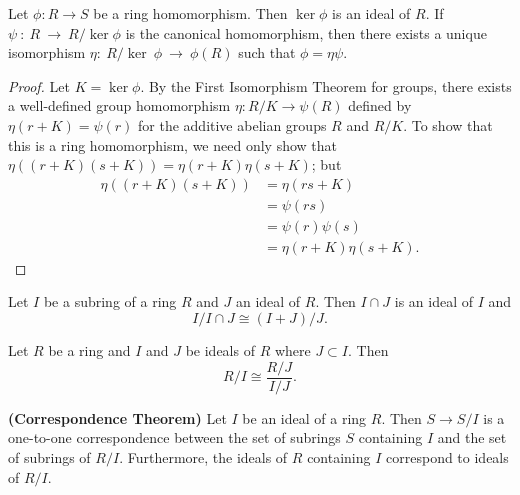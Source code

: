  
\begin{theorem}
Let $\phi : R \rightarrow S$ be a ring homomorphism. Then $\ker \phi$
is an ideal of $R$. If $\psi~:~R~\rightarrow~R/\ker \phi$ is the
canonical homomorphism, then there exists a unique isomorphism
$\eta:~R/\ker~\phi~\rightarrow~\phi(R)$ such that $\phi = \eta \psi$. 
\end{theorem}
 
 
\begin{proof}
Let $K = \ker \phi$. By the First Isomorphism Theorem for groups, there
exists a well-defined group homomorphism $\eta: R/K \rightarrow
\psi(R)$ defined by $\eta(r + K) = \psi(r)$ for the additive abelian
groups $R$ and $R/K$.  To show that this is a ring homomorphism, we
need only show that $\eta( (r + K)(s + K) ) = \eta(r + K) \eta( s +
K)$; but
\begin{align*}
\eta( (r + K)( s +K )) & = \eta(r s +K ) \\
& = \psi(r s) \\
& = \psi(r) \psi(s) \\
& = \eta( r + K ) \eta( s + K ).
\end{align*}
\end{proof}
 
 
\begin{theorem}
Let $I$ be a  subring of a ring $R$  and  $J$ an ideal of $R$.  Then
$I \cap J$ is an ideal of $I$ and 
\[
I / I \cap J \cong (I+ J) /J.
\]
\end{theorem}
 
 
\begin{theorem}
Let $R$ be a ring and $I$ and $J$ be ideals of $R$ where $J \subset
I$.  Then 
\[
R/I \cong \frac{R/J}{I/J}.
\]
\end{theorem}
 
 
\begin{theorem} {\bf (Correspondence Theorem)}\label{rings:correspond_theorem}
Let $I$ be an ideal of a ring $R$. Then $S \rightarrow S/I$ is a
one-to-one correspondence between the set of subrings $S$ containing
$I$  and the set of subrings of $R/I$. Furthermore, the ideals
of $R$ containing $I$ correspond to ideals of $R/I$. 
\end{theorem}
 
 
 
 
 
